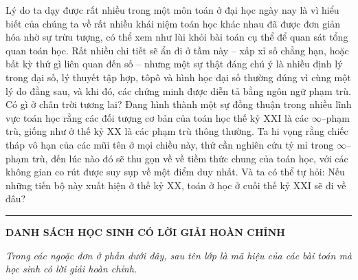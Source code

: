 \begin{multicols}{2}
	\vskip 0.1cm
	Lý do ta dạy được rất nhiều trong một môn toán ở đại học ngày nay là vì hiểu biết của chúng ta về rất nhiều khái niệm toán học khác nhau đã được đơn giản hóa nhờ sự trừu tượng, có thể xem như lùi khỏi bài toán cụ thể để quan sát tổng quan toán học. Rất nhiều chi tiết sẽ ẩn đi ở tầm này -- xấp xỉ số chẳng hạn, hoặc bất kỳ thứ gì liên quan đến số -- nhưng một sự thật đáng chú ý là nhiều định lý trong đại số, lý thuyết tập hợp, tôpô và hình học đại số thường đúng vì cùng một lý do đằng sau, và khi đó, các chứng minh được diễn tả bằng ngôn ngữ phạm trù.
	\vskip 0.1cm
	Có gì ở chân trời tương lai? Đang hình thành một sự đồng thuận trong nhiều lĩnh vực toán học rằng các đối tượng cơ bản của toán học thế kỷ XXI là các $\infty$--phạm trù, giống như ở thế kỷ XX là các phạm trù thông thường. Ta hi vọng rằng chiếc tháp vô hạn của các mũi tên ở mọi chiều này, thứ cần nghiên cứu tỷ mỉ trong $\infty$--phạm trù, đến lúc nào đó sẽ thu gọn về về tiềm thức chung của toán học, với các không gian co rút được suy sụp về một điểm duy nhất. Và ta có thể tự hỏi: Nếu những tiến bộ này xuất hiện ở thế kỷ XX, toán ở học ở cuối thế kỷ XXI sẽ đi về đâu?
\end{multicols}
\vspace*{-10pt}
{\color{duongvaotoanhoc}\rule{1\linewidth}{0.1pt}}
\begin{center}
	\textbf{\color{duongvaotoanhoc}DANH SÁCH HỌC SINH CÓ LỜI GIẢI HOÀN CHỈNH}
\end{center}
\textit{Trong các ngoặc đơn ở phần dưới đây, sau tên lớp là mã hiệu của các bài toán mà học sinh có lời giải hoàn chỉnh.}

